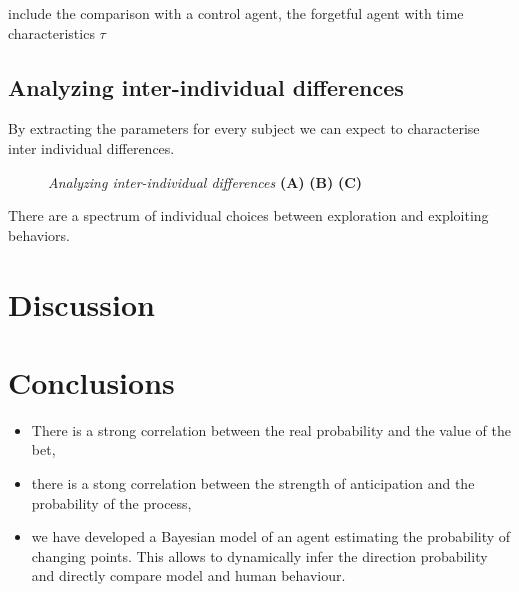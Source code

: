 \documentclass[profile,final,english, draft]{article}%
\begin{document}
include the comparison with a control agent, the forgetful agent with time characteristics $\tau$

\subsection{Analyzing inter-individual differences}

By extracting the parameters for every subject we can expect to characterise inter individual differences. 

\begin{figure}%
\caption{\emph{Analyzing inter-individual differences} \textbf{(A)} 
\textbf{(B)} 
\textbf{(C)}  }
\label{fig:results_psycho_inter}
\end{figure}

There are a spectrum of individual choices between exploration and exploiting behaviors.



\section{Discussion}


\section{Conclusions}


\begin{itemize}\setlength{\itemsep}{0ex}
\item There is a strong correlation between the real probability and the value of the bet,

\item there is a stong correlation between the strength of anticipation and the probability of the process,

\item we have developed a Bayesian model of an agent estimating the probability of changing points. This allows to dynamically infer the direction probability and directly compare model and human behaviour.

\end{itemize}

{\tiny
\printbibliography
}
\end{document}
